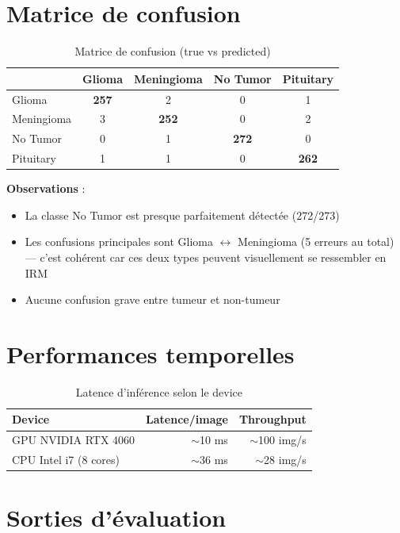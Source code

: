 \documentclass[11pt,a4paper,oneside]{report}
\newcommand{\rt}[1]{\textcolor{accentred}{#1}}
\newcommand{\og}[1]{\textcolor{accentorange}{#1}}
\newcommand{\gn}[1]{\textcolor{accentgreen}{#1}}
\newcommand{\bl}[1]{\textcolor{accentblue}{#1}}
\begin{document}
\section{Matrice de confusion}

\begin{table}[!htbp]
\centering
\caption{Matrice de confusion (true vs predicted)}
\begin{tabular}{l|cccc}
\toprule
& \rt{Glioma} & \og{Meningioma} & \gn{No Tumor} & \bl{Pituitary} \\
\midrule
\rt{Glioma}      & \textbf{257} & 2 & 0 & 1 \\
\og{Meningioma}  & 3 & \textbf{252} & 0 & 2 \\
\gn{No Tumor}    & 0 & 1 & \textbf{272} & 0 \\
\bl{Pituitary}   & 1 & 1 & 0 & \textbf{262} \\
\bottomrule
\end{tabular}
\end{table}

\textbf{Observations} :
\begin{itemize}
\item La classe \gn{No Tumor} est presque parfaitement détectée (272/273)
\item Les confusions principales sont \rt{Glioma} $\leftrightarrow$ \og{Meningioma} (5 erreurs au total) — c'est cohérent car ces deux types peuvent visuellement se ressembler en IRM
\item Aucune confusion grave entre tumeur et non-tumeur
\end{itemize}

\section{Performances temporelles}

\begin{table}[!htbp]
\centering
\caption{Latence d'inférence selon le device}
\begin{tabular}{lrr}
\toprule
\textbf{Device} & \textbf{Latence/image} & \textbf{Throughput} \\
\midrule
GPU NVIDIA RTX 4060 & $\sim$10 ms & $\sim$100 img/s \\
CPU Intel i7 (8 cores) & $\sim$36 ms & $\sim$28 img/s \\
\bottomrule
\end{tabular}
\end{table}

\section{Sorties d'évaluation}
\end{document}

